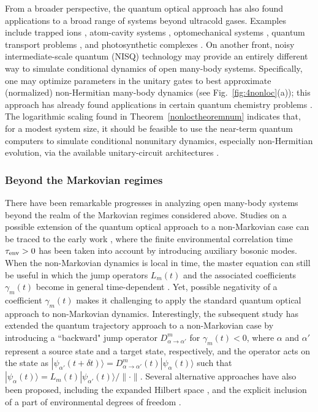 \documentclass{tADP2e}
\theoremstyle{plain}
\theoremstyle{plain}
\theoremstyle{definition}
\begin{document}
From a broader perspective, the quantum optical approach has also found applications to a broad range of systems beyond ultracold gases. Examples include trapped ions \cite{JE03,MM12}, atom-cavity systems \cite{BK10,BF13,MG16,Dogra1496,RCEI18}, optomechanical systems \cite{AM14}, quantum transport problems \cite{KM11,LM19,CL19,PT14},  and photosynthetic complexes \cite{MM08}. On another front, noisy intermediate-scale quantum (NISQ) technology may provide an entirely different way to simulate conditional dynamics of open many-body systems. Specifically, one may optimize parameters in the unitary gates to best approximate (normalized) non-Hermitian many-body dynamics (see Fig.~\ref{fig:4nonloc}(a)); this approach has already found applications in certain quantum chemistry problems \cite{Moll_2018,MM20}. 
The logarithmic scaling found in Theorem~\ref{nonloctheoremnum} indicates that, for a modest system size, it should be feasible to use the near-term quantum computers to simulate conditional nonunitary dynamics, especially non-Hermitian evolution, via the available unitary-circuit architectures \cite{Moll_2018}.  

\subsubsection{Beyond the Markovian regimes}\label{Sec:BMR}
There have been remarkable progresses  in analyzing open many-body systems beyond the realm of the Markovian regimes considered above. Studies on a possible extension of the quantum optical approach to a non-Markovian case can be traced to the early work \cite{IA94}, where the finite environmental correlation time $\tau_{\rm env}>0$ has been taken into account by introducing auxiliary bosonic modes. When the non-Markovian dynamics is local in time,  the master equation can still be useful in which  the jump operators $ {L}_{m}(t)$ and the associated coefficients $\gamma_{m}(t)$ become in general time-dependent \cite{BHP07}. Yet, possible negativity of a coefficient $\gamma_{m}(t)$  makes it challenging to apply the standard quantum optical approach to non-Markovian dynamics. Interestingly, the subsequent study \cite{PJ08} has extended the quantum trajectory approach to a non-Markovian case by introducing a ``backward" jump operator $ {D}_{\alpha\to\alpha'}^{m}$ for $\gamma_{m}(t)<0$, where $\alpha$ and $\alpha'$ represent a source state  and a target state, respectively, and the operator acts on the state as $|\psi_{\alpha'}(t+\delta t)\rangle= {D}^{m}_{\alpha\to\alpha'}(t)|\psi_{\alpha}(t)\rangle$ such that $|\psi_\alpha (t)\rangle= {L}_{m}(t)|\psi_{\alpha'}(t)\rangle/{\| \cdot \|}$. Several alternative approaches have also been proposed, including the expanded Hilbert space \cite{dVI17}, and the explicit inclusion of a part of environmental degrees of freedom \cite{RT16,Dorda_2017}.
\end{document}
